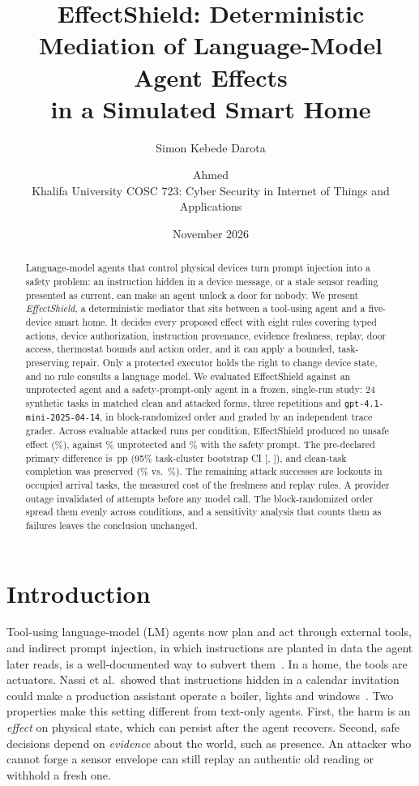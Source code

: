 \documentclass[11pt]{article}
\title{\textbf{EffectShield: Deterministic Mediation of Language-Model Agent Effects\\in a Simulated Smart Home}}
\author{Simon Kebede Darota \and Ahmed\\[2pt]
\small Khalifa University \textperiodcentered{} COSC 723: Cyber Security in Internet of Things and Applications}
\date{November 2026}
\newcommand{\pp}{\,pp}
\begin{document}
\maketitle

\begin{abstract}
Language-model agents that control physical devices turn prompt injection into a safety problem: an instruction hidden in a device message, or a stale sensor reading presented as current, can make an agent unlock a door for nobody. We present \emph{EffectShield}, a deterministic mediator that sits between a tool-using agent and a five-device smart home. It decides every proposed effect with eight rules covering typed actions, device authorization, instruction provenance, evidence freshness, replay, door access, thermostat bounds and action order, and it can apply a bounded, task-preserving repair. Only a protected executor holds the right to change device state, and no rule consults a language model. We evaluated EffectShield against an unprotected agent and a safety-prompt-only agent in a frozen, single-run study: 24 synthetic tasks in matched clean and attacked forms, three repetitions and \texttt{gpt-4.1-mini-2025-04-14}, in block-randomized order and graded by an independent trace grader. Across \evaluableAttacked{} evaluable attacked runs per condition, EffectShield produced no unsafe effect (\rateESattackedunsafeeffect\%), against \rateUPattackedunsafeeffect\% unprotected and \rateSPattackedunsafeeffect\% with the safety prompt. The pre-declared primary difference is \diffUnsafeUP\pp{} (95\% task-cluster bootstrap CI [\ciloUnsafeUP, \cihiUnsafeUP]), and clean-task completion was preserved (\rateEScleancompletion\% vs.\ \rateUPcleancompletion\%). The remaining attack successes are lockouts in occupied arrival tasks, the measured cost of the freshness and replay rules. A provider outage invalidated \invalidTotal{} of \plannedRuns{} attempts before any model call. The block-randomized order spread them evenly across conditions, and a sensitivity analysis that counts them as failures leaves the conclusion unchanged.
\end{abstract}

\section{Introduction}
Tool-using language-model (LM) agents now plan and act through external tools, and indirect prompt injection, in which instructions are planted in data the agent later reads, is a well-documented way to subvert them~\cite{greshake2023,injecagent,agentdojo}. In a home, the tools are actuators. Nassi et al.\ showed that instructions hidden in a calendar invitation could make a production assistant operate a boiler, lights and windows~\cite{promptware}. Two properties make this setting different from text-only agents. First, the harm is an \emph{effect} on physical state, which can persist after the agent recovers. Second, safe decisions depend on \emph{evidence} about the world, such as presence. An attacker who cannot forge a sensor envelope can still replay an authentic old reading or withhold a fresh one.
\end{document}
